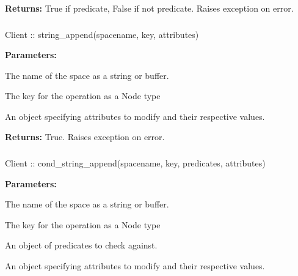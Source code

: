 \noindent\textbf{Returns:}
True if predicate, False if not predicate.  Raises exception on error.

\subsubsection{}
\label{api:nodejs:string_append}
\begin{javascriptcode}
Client :: string_append(spacename, key, attributes)
\end{javascriptcode}


\noindent\textbf{Parameters:}
\begin{description}[labelindent=\widthof{{\code{attributes}}},leftmargin=*,noitemsep,nolistsep,align=right]
\item[\code{spacename}] The name of the space as a string or buffer.
\item[\code{key}] The key for the operation as a Node type
\item[\code{attributes}] An object specifying attributes to modify and their respective values.
\end{description}

\noindent\textbf{Returns:}
True.  Raises exception on error.

\subsubsection{}
\label{api:nodejs:cond_string_append}
\begin{javascriptcode}
Client :: cond_string_append(spacename, key, predicates, attributes)
\end{javascriptcode}


\noindent\textbf{Parameters:}
\begin{description}[labelindent=\widthof{{\code{predicates}}},leftmargin=*,noitemsep,nolistsep,align=right]
\item[\code{spacename}] The name of the space as a string or buffer.
\item[\code{key}] The key for the operation as a Node type
\item[\code{predicates}] An object of predicates to check against.
\item[\code{attributes}] An object specifying attributes to modify and their respective values.
\end{description}

